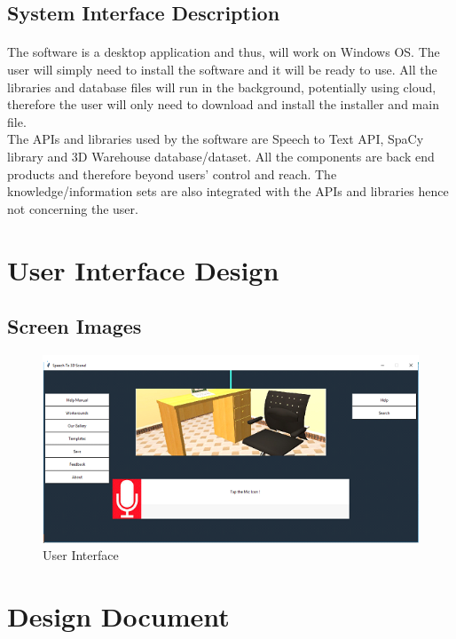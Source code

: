 \newpage

\subsection{System Interface Description}
\paragraph{}
The software is a desktop application and thus, will work on Windows OS. The user will simply need to install the software and it will be ready to use. All the libraries and database files will run in the background, potentially using cloud, therefore the user will only need to download and install the installer and main file.\\
The APIs and libraries used by the software are Speech to Text API, SpaCy library and 3D Warehouse database/dataset. All the components are back end products and therefore beyond users’ control and reach. The knowledge/information sets are also integrated with the APIs and libraries hence not concerning the user.
\section{User Interface Design}

\subsection{Screen Images}
\begin{figure}[htbp]
	\centering
		\includegraphics{ui2.png}
	\caption{User Interface}
	\label{fig:ui2}
\end{figure}
\newpage

\section{Design Document}
